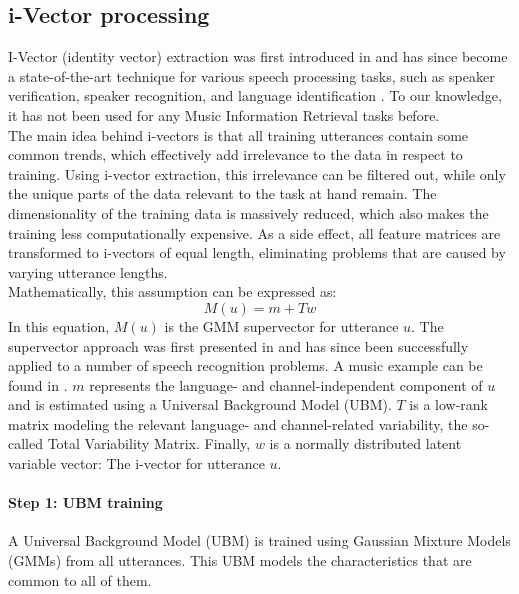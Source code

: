 \subsection{i-Vector processing}
I-Vector (identity vector) extraction was first introduced in \cite{Dehak2011} and has since become a state-of-the-art technique for various speech processing tasks, such as speaker verification, speaker recognition, and language identification \cite{Martinez2011}. To our knowledge, it has not been used for any Music Information Retrieval tasks before. \\
The main idea behind i-vectors is that all training utterances contain some common trends, which effectively add irrelevance to the data in respect to training. Using i-vector extraction, this irrelevance can be filtered out, while only the unique parts of the data relevant to the task at hand remain. The dimensionality of the training data is massively reduced, which also makes the training less computationally expensive. As a side effect, all feature matrices are transformed to i-vectors of equal length, eliminating problems that are caused by varying utterance lengths.\\
Mathematically, this assumption can be expressed as:
\begin{equation}
M(u) = m+Tw
\end{equation}
In this equation, $M(u)$ is the GMM supervector for utterance $u$. The supervector approach was first presented in \cite{reynolds00} and has since been successfully applied to a number of speech recognition problems. A music example can be found in \cite{Charbuillet2011}. $m$ represents the language- and channel-independent component of $u$ and is estimated using a Universal Background Model (UBM). $T$ is a low-rank matrix modeling the relevant language- and channel-related variability, the so-called Total Variability Matrix. Finally, $w$ is a normally distributed latent variable vector: The i-vector for utterance $u$.

\paragraph*{Step 1: UBM training} A Universal Background Model (UBM) is trained using Gaussian Mixture Models (GMMs) from all utterances. This UBM models the characteristics that are common to all of them.
